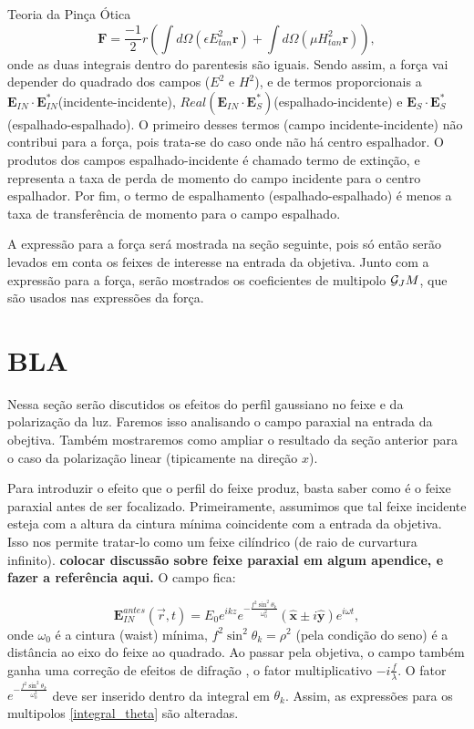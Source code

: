 \begin{chapter}{Teoria da Pinça Ótica}
\begin{equation}
{\mathbf F}=\frac{-1}{2}r\left( \int d\Omega (\epsilon E^2_{tan}{\mathbf r}) + \int d\Omega (\mu H^2_{tan}{\mathbf r}) \right),
\end{equation}
%
onde as duas integrais dentro do parentesis são iguais. Sendo assim, a força vai depender do quadrado dos campos ($E^2$ e $H^2$), e de termos proporcionais a ${\mathbf E}_{IN}\cdot{\mathbf E}_{IN}^*$(incidente-incidente), $Real({\mathbf E}_{IN}\cdot{\mathbf E}_S^*)$(espalhado-incidente) e ${\mathbf E}_S\cdot{\mathbf E}_S^*$(espalhado-espalhado). O primeiro desses termos (campo incidente-incidente) não contribui para a força, pois trata-se do caso onde não há centro espalhador. O produtos dos campos espalhado-incidente é chamado termo de extinção, e representa a taxa de perda de momento do campo incidente para o centro espalhador. Por fim, o termo de espalhamento (espalhado-espalhado) é menos a taxa de transferência de momento para o campo espalhado.

A expressão para a força será mostrada na seção seguinte, pois só então serão levados em conta os feixes de interesse na entrada da objetiva. Junto com a expressão para a força, serão mostrados os coeficientes de multipolo $\mathcal G_JM$, que são usados nas expressões da força.

\section{BLA}

Nessa seção serão discutidos os efeitos do perfil gaussiano no feixe e da polarização da luz. Faremos isso analisando o campo paraxial na entrada da obejtiva. Também mostraremos como ampliar o resultado da seção anterior para o caso da polarização linear (tipicamente na direção $x$).

Para introduzir o efeito que o perfil do feixe produz, basta saber como é o feixe paraxial antes de ser focalizado. Primeiramente, assumimos que tal feixe incidente esteja com a altura da cintura mínima coincidente com a entrada da objetiva. Isso nos permite tratar-lo como um feixe cilíndrico (de raio de curvartura infinito). {\bf colocar discussão sobre feixe paraxial em algum apendice, e fazer a referência aqui.} O campo fica:

\begin{equation}
{\mathbf E}_{IN}^{antes}(\vec{r},t)=E_0 e^{ikz} e^{-\frac{f^2\sin^2\theta_k}{\omega_0^2}}(\hat{{\mathbf x}}\pm i\hat{{\mathbf y}}) e^{i\omega t},
\label{campo_ent}
\end{equation}
%
onde $\omega_0$ é a cintura (waist) mínima, $f^2\sin^2\theta_k=\rho^2$ (pela condição do seno) é a distância ao eixo do feixe ao quadrado. Ao passar pela objetiva, o campo também ganha uma correção de efeitos de difração \cite{RICHARDSeWOLF}, o fator multiplicativo $-i\frac{f}{\lambda}$. O fator $e^{-\frac{f^2\sin^2\theta_k}{\omega_0^2}}$ deve ser inserido dentro da integral em $\theta_k$. Assim, as expressões para os multipolos \ref{integral_theta} são alteradas.


\end{chapter}
